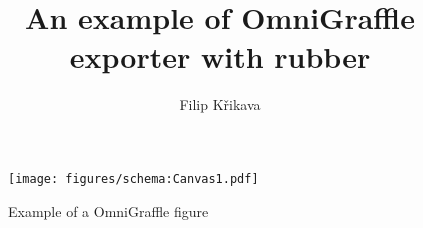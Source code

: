\documentclass[english,a4paper]{article}
\begin{document}
\title{An example of OmniGraffle exporter with rubber}
\author{Filip Křikava}

\maketitle 

\begin{figure}
  \centering
  \texttt{[image: figures/schema:Canvas1.pdf]}
  \caption{Example of a OmniGraffle figure}
\end{figure}
\end{document}
